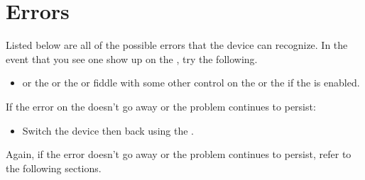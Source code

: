 \chapter{Errors} \label{Error Codes}

Listed below are all of the possible errors that the device can recognize.  In
the event that you see one show up on the , try the following.

\begin{itemize}
  \item {} or  the  or  the  or fiddle with
    some other control on the  or  the  if the  is
    enabled.
\end{itemize}

If the error on the  doesn't go away or the problem continues to persist:

\begin{itemize}
  \item Switch the device  then back  using the .
\end{itemize}

Again, if the error doesn't go away or the problem continues to persist, refer
to the following sections.


